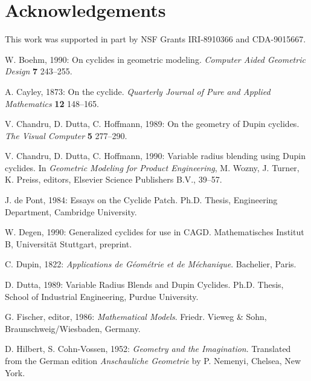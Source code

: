 \clearpage

\section{Acknowledgements}

This work was supported in part by NSF Grants IRI-8910366 and CDA-9015667.

\begin{thebibliography}{999}

     W. Boehm, 1990: On cyclides in geometric modeling.
     {\em Computer Aided Geometric Design} {\bf 7} 243--255.

     A. Cayley, 1873: On the cyclide.
     {\em Quarterly Journal of Pure and Applied Mathematics} {\bf 12}
     148--165.

     V. Chandru, D. Dutta, C. Hoffmann, 1989:
     On the geometry of Dupin cyclides.
     {\em The Visual Computer} {\bf 5} 277--290.

     V. Chandru, D. Dutta, C. Hoffmann, 1990:
     Variable radius blending using Dupin cyclides.
     In {\em Geometric Modeling for Product Engineering},
     M. Wozny, J. Turner, K. Preiss, editors, 
     Elsevier Science Publishers B.V., 39--57.

     J. de Pont, 1984:
     Essays on the Cyclide Patch.
     Ph.D. Thesis, Engineering Department, Cambridge University.

     W. Degen, 1990:
     Generalized cyclides for use in CAGD.
     Mathematisches Institut B, Universit\"{a}t Stuttgart,
     preprint.

     C. Dupin, 1822:
     {\em Applications de G\'{e}om\'{e}trie et de M\'{e}chanique}.
     Bachelier, Paris.
     
     D. Dutta, 1989:
     Variable Radius Blends and Dupin Cyclides.
     Ph.D. Thesis, School of Industrial Engineering, Purdue University.

     G. Fischer, editor, 1986:
     {\em Mathematical Models}.
     Friedr. Vieweg \& Sohn, Braunschweig/Wiesbaden, Germany.

     D. Hilbert, S. Cohn-Vossen, 1952:
     {\em Geometry and the Imagination}.
     Translated from the German edition {\em Anschauliche Geometrie} by
          P. Nemenyi,
     Chelsea, New York.


\end{thebibliography}
